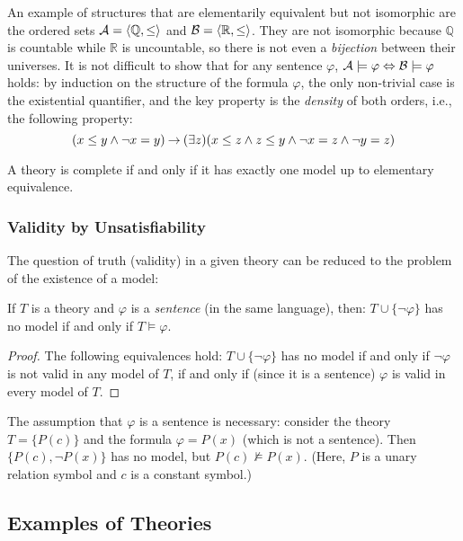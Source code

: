 \begin{example}\label{example:elementary-equivalence-of-orders-R-Q}
    An example of structures that are elementarily equivalent but not isomorphic are the ordered sets $\mathcal{A}=\langle\mathbb Q,\leq\rangle$ and $\mathcal{B}=\langle\mathbb R,\leq\rangle$. They are not isomorphic because $\mathbb Q$ is countable while $\mathbb R$ is uncountable, so there is not even a \emph{bijection} between their universes. It is not difficult to show that for any sentence $\varphi$, $\mathcal{A}\models\varphi\Leftrightarrow\mathcal{B}\models\varphi$ holds: by induction on the structure of the formula $\varphi$, the only non-trivial case is the existential quantifier, and the key property is the \emph{density} of both orders, i.e., the following property:
    $$
    (x\leq y\land \neg x=y)\mathbin{\rightarrow}(\exists z)(x\leq z\land z\leq y\land \neg x=z\land\neg y=z)
    $$

\end{example}
\begin{observation}
    A theory is complete if and only if it has exactly one model up to elementary equivalence.    
\end{observation}

\subsubsection{Validity by Unsatisfiability}

The question of truth (validity) in a given theory can be reduced to the problem of the existence of a model:
\begin{proposition}
    If $T$ is a theory and $\varphi$ is a \emph{sentence} (in the same language), then: $T\cup\{\neg\varphi\}$ has no model if and only if $T\models\varphi$.
\end{proposition}
\begin{proof}
    The following equivalences hold: $T\cup\{\neg\varphi\}$ has no model if and only if $\neg\varphi$ is not valid in any model of $T$, if and only if (since it is a sentence) $\varphi$ is valid in every model of $T$.
\end{proof}

The assumption that $\varphi$ is a sentence is necessary: consider the theory $T=\{P(c)\}$ and the formula $\varphi=P(x)$ (which is not a sentence). Then $\{P(c),\neg P(x)\}$ has no model, but $P(c)\not\models P(x)$. (Here, $P$ is a unary relation symbol and $c$ is a constant symbol.)

\subsection{Examples of Theories}

